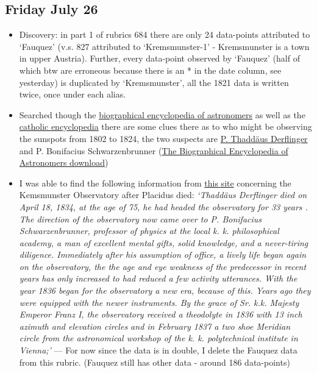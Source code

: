 \documentclass[12pt]{article}
\begin{document}
\subsection{Friday July 26}
\begin{itemize}
    \begin{itemize}
        \begin{itemize}
            \item Discovery: in part 1 of rubrics 684 there are only 24 data-points attributed to `Fauquez' (v.s. 827 attributed to `Kremsmunster-1' - Kremsmunster is a town in upper Austria). Further, every data-point observed by `Fauquez' (half of which btw are erroneous because there is an * in the date column, see yesterday) is duplicated by `Kremsmunster', all the 1821 data is written twice, once under each alias.
            \item Searched though the \href{https://link.springer.com/referencework/10.1007/978-0-387-30400-7}{biographical encyclopedia of astronomers} as well as the \href{http://libgen.io/search.php?req=Catholic+Encyclopedia&lg_topic=libgen&open=0&view=simple&res=25&phrase=1&column=def}{catholic encyclopedia} there are some clues there as to who might be observing the sunspots from 1802 to 1824, the two suspects are \href{http://www.specula.at/adv/derfling.htm}{P. Thaddäus Derflinger} and P. Bonifacius Schwarzenbrunner (\href{http://booksdescr.org/item/index.php?md5=B794C8ED51AC97D042F20C39D54BB87F}{The Biographical Encyclopedia of Astronomers download}) 
            \item I was able to find the following information from \href{https://digi.landesbibliothek.at/viewer/fulltext/AC08094596/5/}{this site} concerning the Kemsmunster Observatory after Placidus died: \textit{`Thaddäus Derflinger died on April 18, 1834, at the age of 75, he had headed the observatory for 33 years . The direction of the observatory now came over to P. Bonifacius Schwarzenbrunner, professor of physics at the local k. k. philosophical academy, a man of excellent mental gifts, solid knowledge, and a never-tiring diligence. Immediately after his assumption of office, a lively life began again on the observatory, the the age and eye weakness of the predecessor in recent years has only increased to had reduced a few activity utterances. With the year 1836 began for the observatory a new era, because of this. Years ago they were equipped with the newer instruments. By the grace of Sr. k.k. Majesty Emperor Franz I, the observatory received a theodolyte in 1836 with 13 inch azimuth and elevation circles and in February 1837 a two shoe Meridian circle from the astronomical workshop of the k. k. polytechnical institute in Vienna;'} --- For now since the data is in double, I delete the Fauquez data from this rubric. (Fauquez still has other data - around 186 data-points)

\end{itemize}
\end{itemize}
\end{itemize}
\end{document}
